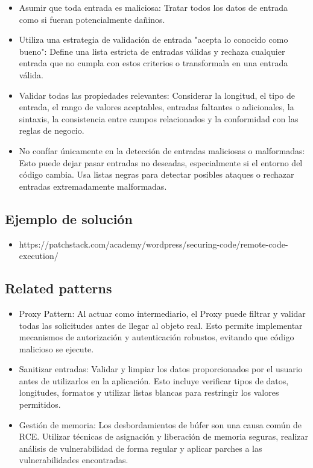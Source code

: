 \begin{itemize}
    \item Asumir que toda entrada es maliciosa: Tratar todos los datos de entrada como si fueran potencialmente dañinos.
    \item Utiliza una estrategia de validación de entrada "acepta lo conocido como bueno": Define una lista estricta de entradas válidas y rechaza cualquier entrada que no cumpla con estos criterios o transformala en una entrada válida.
    \item Validar todas las propiedades relevantes: Considerar la longitud, el tipo de entrada, el rango de valores aceptables, entradas faltantes o adicionales, la sintaxis, la consistencia entre campos relacionados y la conformidad con las reglas de negocio.
    \item No confíar únicamente en la detección de entradas maliciosas o malformadas: Esto puede dejar pasar entradas no deseadas, especialmente si el entorno del código cambia. Usa listas negras para detectar posibles ataques o rechazar entradas extremadamente malformadas.
\end{itemize}

\subsection*{Ejemplo de solución}

\begin{itemize}
    \item https://patchstack.com/academy/wordpress/securing-code/remote-code-execution/
\end{itemize}

\subsection*{Related patterns}

\begin{itemize}
    \item Proxy Pattern: Al actuar como intermediario, el Proxy puede filtrar y validar todas las solicitudes antes de llegar al objeto real. Esto permite implementar mecanismos de autorización y autenticación robustos, evitando que código malicioso se ejecute.
    \item Sanitizar entradas: Validar y limpiar los datos proporcionados por el usuario antes de utilizarlos en la aplicación. Esto incluye verificar tipos de datos, longitudes, formatos y utilizar listas blancas para restringir los valores permitidos.
    \item Gestión de memoria: Los desbordamientos de búfer son una causa común de RCE. Utilizar técnicas de asignación y liberación de memoria seguras, realizar análisis de vulnerabilidad de forma regular y aplicar parches a las vulnerabilidades encontradas.
\end{itemize}
